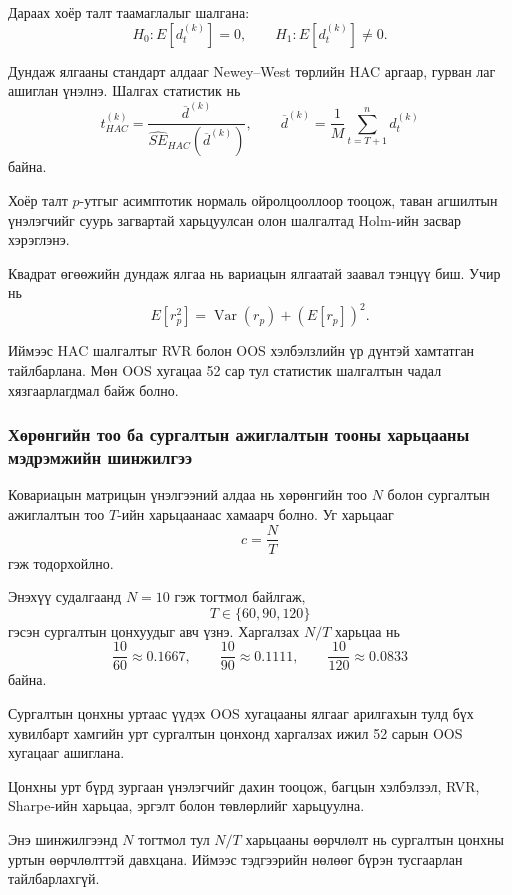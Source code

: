 Дараах хоёр талт таамаглалыг шалгана:
\[
H_0:E[d_t^{(k)}]=0,
\qquad
H_1:E[d_t^{(k)}]\neq 0.
\]

Дундаж ялгааны стандарт алдааг
Newey--West төрлийн HAC аргаар,
гурван лаг ашиглан үнэлнэ.
Шалгах статистик нь
\[
t_{HAC}^{(k)}
=
\frac{\overline{d}^{(k)}}
{\widehat{SE}_{HAC}
	(\overline{d}^{(k)})},
\qquad
\overline{d}^{(k)}
=
\frac{1}{M}
\sum_{t=T+1}^{n}d_t^{(k)}
\]
байна.

Хоёр талт $p$-утгыг асимптотик
нормаль ойролцооллоор тооцож,
таван агшилтын үнэлэгчийг суурь
загвартай харьцуулсан олон шалгалтад
Holm-ийн засвар хэрэглэнэ.

Квадрат өгөөжийн дундаж ялгаа нь
вариацын ялгаатай заавал тэнцүү биш.
Учир нь
\[
E[r_p^2]
=
\operatorname{Var}(r_p)
+
\left(E[r_p]\right)^2.
\]

Иймээс HAC шалгалтыг RVR болон
OOS хэлбэлзлийн үр дүнтэй хамтатган
тайлбарлана. Мөн OOS хугацаа
52 сар тул статистик шалгалтын
чадал хязгаарлагдмал байж болно.


\subsubsection{Хөрөнгийн тоо ба сургалтын
	ажиглалтын тооны харьцааны мэдрэмжийн шинжилгээ}
\label{subsubsec:nt_sensitivity}

Ковариацын матрицын үнэлгээний алдаа
нь хөрөнгийн тоо $N$ болон сургалтын
ажиглалтын тоо $T$-ийн харьцаанаас
хамаарч болно. Уг харьцааг
\[
c=\frac{N}{T}
\]
гэж тодорхойлно.

Энэхүү судалгаанд $N=10$ гэж
тогтмол байлгаж,
\[
T\in\{60,90,120\}
\]
гэсэн сургалтын цонхуудыг авч үзнэ.
Харгалзах $N/T$ харьцаа нь
\[
\frac{10}{60}\approx0.1667,\qquad
\frac{10}{90}\approx0.1111,\qquad
\frac{10}{120}\approx0.0833
\]
байна.

Сургалтын цонхны уртаас үүдэх
OOS хугацааны ялгааг арилгахын
тулд бүх хувилбарт хамгийн урт
сургалтын цонхонд харгалзах
ижил 52 сарын OOS хугацааг ашиглана.

Цонхны урт бүрд зургаан үнэлэгчийг
дахин тооцож, багцын хэлбэлзэл,
RVR, Sharpe-ийн харьцаа, эргэлт
болон төвлөрлийг харьцуулна.

Энэ шинжилгээнд $N$ тогтмол тул
$N/T$ харьцааны өөрчлөлт нь сургалтын
цонхны уртын өөрчлөлттэй давхцана.
Иймээс тэдгээрийн нөлөөг бүрэн
тусгаарлан тайлбарлахгүй.


